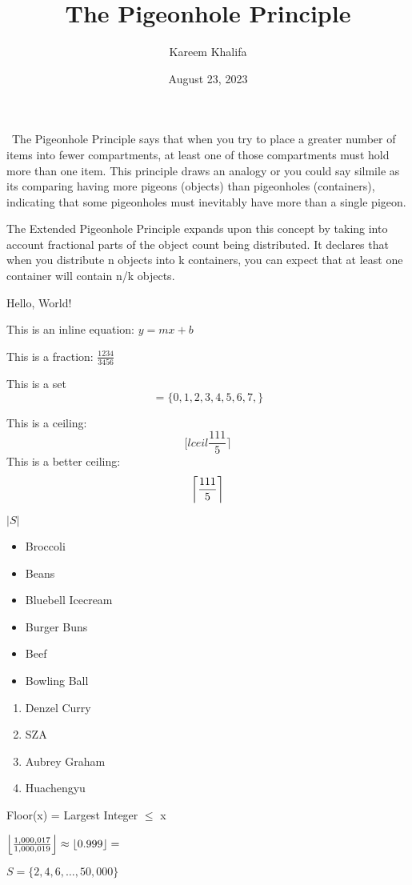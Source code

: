 \documentclass{article}
\title{The Pigeonhole Principle}
\author{Kareem Khalifa}
\date{August 23, 2023}
\DeclarePairedDelimiter{\floor}{\lfloor}{\rfloor}
\DeclarePairedDelimiter{\ceiling}{\lceil}{\rceil}
\begin{document}
\maketitle
\
The Pigeonhole Principle says that when you try to place a greater number of items into fewer compartments, at least one of those compartments must hold more than one item. This principle draws an analogy or you could say silmile as its comparing having more pigeons (objects) than pigeonholes (containers), indicating that some pigeonholes must inevitably have more than a single pigeon.

The Extended Pigeonhole Principle expands upon this concept by taking into account fractional parts of the object count being distributed. It declares that when you distribute n objects into k containers, you can expect that at least one container will contain n/k objects.

Hello, World!

This is an inline equation: $y = mx + b$

This is a fraction: \( \frac{1234}{3456} \)

This is a set \[ = \{0, 1, 2, 3, 4, 5, 6, 7,\} \]

This is a ceiling: \[ [lceil \frac{111}{5} \rceil \]
\newpage
This is a better ceiling: \[ \ceiling*{\frac{111}{5}} \]

\( |S| \)

\begin{itemize}
\item Broccoli
\item Beans
\item Bluebell Icecream
\item Burger Buns
\item Beef
\item Bowling Ball
\end{itemize}

\begin{enumerate}
\item {Denzel Curry}
\item {SZA}
\item {Aubrey Graham}
\item {Huachengyu}
\end{enumerate}

Floor(x) = Largest Integer $\le$ x

$ \floor*{\frac{1,000,017}{1,000,019}} \approx \floor{0.999} = $  



$S = \{2, 4, 6, \ldots, 50,000\} $
\end{document}
